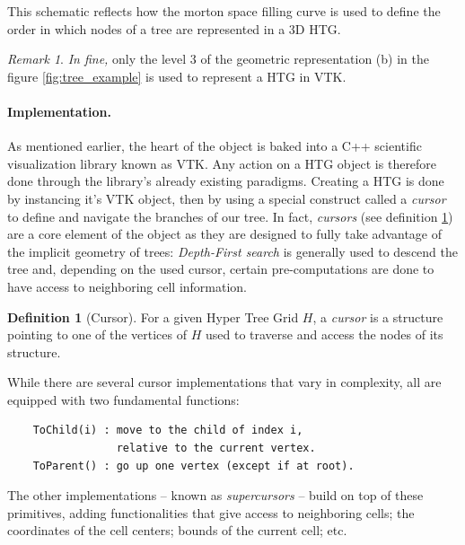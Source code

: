 \documentclass[
	a4paper,
	12pt,
	raggedright,
	twoside
]{tufte-style-article}
\theoremstyle{definition}
\newtheorem{definition}{Definition}[section]
\theoremstyle{remark}
\newtheorem*{remark}{Remark}
\begin{document}
\begin{marginfigure}
    
    \caption{This schematic reflects how the morton space filling curve is used to define the order in which nodes of a tree are represented in a 3D \Gls{HTG}. \label{fig:morton_curve}}
\end{marginfigure}

\begin{remark}
\textit{In fine,} only the level 3 of the geometric representation (b) in the figure \ref{fig:tree_example} is used to represent a \Gls{HTG} in \Gls{VTK}.
\end{remark}

\newpage
\paragraph{Implementation.} As mentioned earlier, the heart of the object is baked into a C++ scientific visualization library known as \Gls{VTK}. Any action on a \Gls{HTG} object is therefore done through the library's already existing paradigms. Creating a \Gls{HTG} is done by instancing it's \Gls{VTK} object, then by using a special construct called a \textit{cursor} to define and navigate the branches of our tree. In fact, \textit{cursors} (see definition \ref{def:cursor}) are a core element of the object as they are designed to fully take advantage of the implicit geometry of trees: \textit{Depth-First search} is generally used to descend the tree and, depending on the used cursor, certain pre-computations are done to have access to neighboring cell information.

\begin{definition}[Cursor]\label{def:cursor}
For a given Hyper Tree Grid $H$, a \textit{cursor} is a structure pointing to one of the vertices of $H$ used to traverse and access the nodes of its structure.
\end{definition}
While there are several cursor implementations that vary in complexity, all are equipped with two fundamental functions:
\begin{verbatim}
    ToChild(i) : move to the child of index i,
                 relative to the current vertex.
    ToParent() : go up one vertex (except if at root).
\end{verbatim}
The other implementations -- known as \textit{supercursors} -- build on top of these primitives, adding functionalities that give access to neighboring cells; the coordinates of the cell centers; bounds of the current cell; etc.
\end{document}
